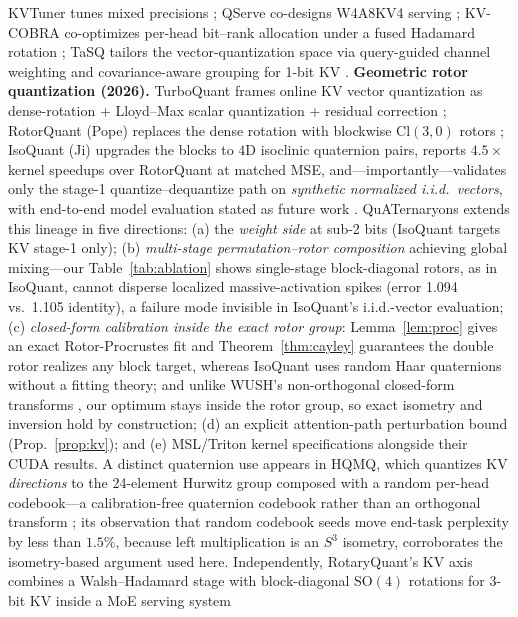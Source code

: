 \documentclass{article}
\begin{document}
KVTuner tunes mixed precisions \citep{li2025kvtuner}; QServe co-designs
W4A8KV4 serving \citep{lin2024qserve}; KV-COBRA co-optimizes per-head bit--rank
allocation under a fused Hadamard rotation \citep{ha2026kvcobra}; TaSQ tailors
the vector-quantization space via query-guided channel weighting and
covariance-aware grouping for 1-bit KV \citep{cheong2026tasq}.
\textbf{Geometric rotor quantization (2026).} TurboQuant frames online KV
vector quantization as dense-rotation + Lloyd--Max scalar quantization +
residual correction \citep{google2025turboquant}; RotorQuant (Pope) replaces
the dense rotation with blockwise $\mathrm{Cl}(3,0)$ rotors
\citep{pope2026rotorquant}; IsoQuant (Ji) upgrades the blocks to $4$D
isoclinic quaternion pairs, reports $4.5\times$ kernel speedups over
RotorQuant at matched MSE, and---importantly---validates only the stage-1
quantize--dequantize path on \emph{synthetic normalized i.i.d.\ vectors}, with
end-to-end model evaluation stated as future work \citep{ji2026isoquant}.
QuATernaryons extends this lineage in five directions: (a) the
\emph{weight side} at sub-2 bits (IsoQuant targets KV stage-1 only); (b)
\emph{multi-stage permutation--rotor composition} achieving global mixing---our
Table~\ref{tab:ablation} shows single-stage block-diagonal rotors, as in
IsoQuant, cannot disperse localized massive-activation spikes (error 1.094 vs.\
1.105 identity), a failure mode invisible in IsoQuant's i.i.d.-vector
evaluation; (c) \emph{closed-form calibration inside the exact rotor group}:
Lemma~\ref{lem:proc} gives an exact Rotor-Procrustes fit and
Theorem~\ref{thm:cayley} guarantees the double rotor realizes any block
target, whereas IsoQuant uses random Haar quaternions without a fitting theory;
and unlike WUSH's non-orthogonal closed-form transforms \citep{chen2026wush},
our optimum stays inside the rotor group, so exact isometry and inversion hold
by construction; (d) an explicit
attention-path perturbation bound (Prop.~\ref{prop:kv}); and (e) MSL/Triton
kernel specifications alongside their CUDA results. A distinct quaternion use
appears in HQMQ, which quantizes KV \emph{directions} to the 24-element Hurwitz
group composed with a random per-head codebook---a calibration-free quaternion
codebook rather than an orthogonal transform \citep{swain2026hqmq}; its
observation that random codebook seeds move end-task perplexity by less than
$1.5\%$, because left multiplication is an $S^3$ isometry, corroborates the
isometry-based argument used here. Independently, RotaryQuant's KV axis combines a Walsh--Hadamard stage with block-diagonal
$\mathrm{SO}(4)$ rotations for 3-bit KV inside a MoE serving system
\end{document}
